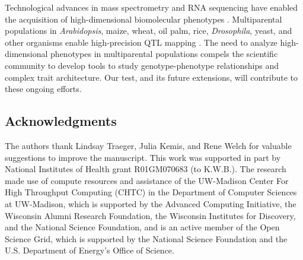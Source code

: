 \documentclass{book}
\begin{document}
Technological advances
in mass spectrometry and RNA sequencing have enabled the acquisition of
high-dimensional biomolecular phenotypes
\citep{ozsolak2011rna,han2012multi}. Multiparental populations in
\textit{Arabidopsis}, maize, wheat, oil palm, rice,
\textit{Drosophila}, yeast, and other organisms enable high-precision
QTL mapping \citep{yu2008genetic, tisne2017identification,
  stanley2017genetic, raghavan2017approaches, mackay2012drosophila,
  kover2009multiparent, cubillos2013high}. The need to analyze
high-dimensional phenotypes in multiparental populations compels the
scientific community to develop tools to study genotype-phenotype
relationships and complex trait architecture. Our test, and its future
extensions, will contribute to these ongoing efforts.




\subsection*{Acknowledgments}

The authors thank Lindsay Traeger, Julia Kemis, and Rene Welch for
valuable suggestions to improve the manuscript. This work was
supported in part by National Institutes of Health grant R01GM070683
(to K.W.B.). The research made use of compute resources and assistance
of the UW-Madison Center For High Throughput Computing (CHTC) in the
Department of Computer Sciences at UW-Madison, which is supported by
the Advanced Computing Initiative, the Wisconsin Alumni Research
Foundation, the Wisconsin Institutes for Discovery, and the National
Science Foundation, and is an active member of the Open Science Grid,
which is supported by the National Science Foundation and the U.S.
Department of Energy's Office of Science.





%




\end{document}

